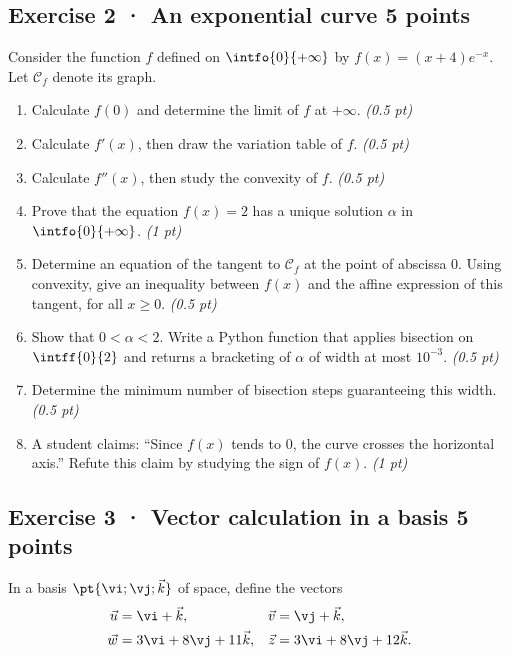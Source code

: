 \subsection*{Exercise 2 · An exponential curve \hfill 5 points}Consider the function $f$ defined on $\intfo{0}{+\infty}$ by $f(x)=(x+4)e^{-x}$. Let $\mathcal C_f$ denote its graph.

\begin{enumerate}

\item Calculate $f(0)$ and determine the limit of $f$ at $+\infty$. \hfill\textit{(0.5 pt)}

\item Calculate $f' (x)$, then draw the variation table of $f$. \hfill\textit{(0.5 pt)}

\item Calculate $f'' (x)$, then study the convexity of $f$. \hfill\textit{(0.5 pt)}

\item Prove that the equation $f(x)=2$ has a unique solution $\alpha$ in $\intfo{0}{+\infty}$. \hfill\textit{(1 pt)}

\item Determine an equation of the tangent to $\mathcal C_f$ at the point of abscissa $0$. Using convexity, give an inequality between $f(x)$ and the affine expression of this tangent, for all $x\ge0$. \hfill\textit{(0.5 pt)}

\item Show that $0<\alpha<2$. Write a Python function that applies bisection on $\intff{0}{2}$ and returns a bracketing of $\alpha$ of width at most $10^{-3}$. \hfill\textit{(0.5 pt)}

\item Determine the minimum number of bisection steps guaranteeing this width. \hfill\textit{(0.5 pt)}

\item A student claims: ``Since $f(x)$ tends to $0$, the curve crosses the horizontal axis.'' Refute this claim by studying the sign of $f(x)$. \hfill\textit{(1 pt)}

\end{enumerate}

\mxnewpage{}

\subsection*{Exercise 3 · Vector calculation in a basis \hfill 5 points}In a basis $\pt{\vi;\vj;\vec k}$ of space, define the vectors
\[\begin{aligned}\vec u&=\vi+\vec k,&\vec v&=\vj+\vec k,\\
\vec w&=3\vi+8\vj+11\vec k,&\vec z&=3\vi+8\vj+12\vec k.\end{aligned}\]


